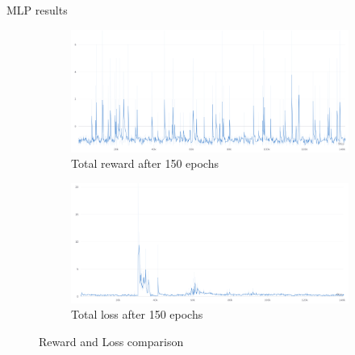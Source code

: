 \documentclass[presentation]{beamer}\mode<presentation>{\usetheme{AMSBolognaFC}}
\begin{document}
\begin{frame}[allowframebreaks]{MLP results}
\begin{figure}
\begin{subfigure}[b]{0.45\textwidth}
			\centering
			\includegraphics[width=\textwidth]{img/rewards.png}
			\caption{Total reward after 150 epochs} 
			\label{fig:i}
		\end{subfigure}
		\hfill
		\begin{subfigure}[b]{0.45\textwidth}
			\centering
			\includegraphics[width=\textwidth]{img/loss.png}
			\caption{Total loss after 150 epochs} 
			\label{fig:l}
		\end{subfigure}
		\caption{Reward and Loss comparison}
		\label{fig:s}
	\end{figure}


\end{frame}
\end{document}
